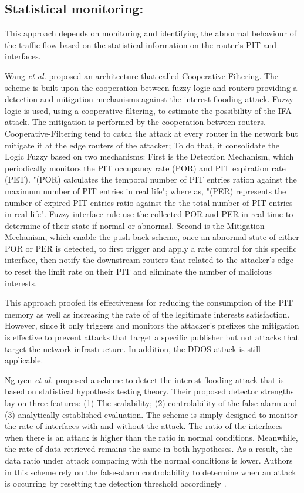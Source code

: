 \documentclass[conference]{IEEEtran}
\begin{document}
\subsection{Statistical monitoring:}

This approach depends on monitoring and identifying the abnormal behaviour of the traffic flow based on the statistical information on the router's PIT and interfaces. 

Wang \textit{et al.} \cite{Wang2014} proposed an architecture that called Cooperative-Filtering. The scheme is built upon the cooperation between fuzzy logic and routers providing a detection and mitigation mechanisms against the interest flooding attack. Fuzzy logic is used, using a cooperative-filtering, to estimate the possibility of the IFA attack. The mitigation is performed by the cooperation between routers. Cooperative-Filtering tend to catch the attack at every router in the network but mitigate it at the edge routers of the attacker; To do that, it consolidate the Logic Fuzzy based on two mechanisms: First is the Detection Mechanism, which periodically monitors the PIT occupancy rate (POR) and  PIT expiration rate (PET). "(POR) calculates the temporal number of PIT entries ration against the maximum number of PIT entries in real life"; where as, "(PER) represents the number of expired PIT entries ratio against the the total number of PIT entries in real life". Fuzzy interface rule use the collected POR and PER in real time to determine of their state if normal or abnormal. Second is the Mitigation Mechanism, which enable the push-back scheme, once an abnormal state of either POR or PER is detected, to first trigger and apply a rate control for this specific interface, then notify the downstream routers that related to the attacker's edge to reset the limit rate on their PIT and eliminate the number of malicious interests.

This approach proofed its effectiveness for reducing the consumption of the PIT memory as well as increasing the rate of of the legitimate interests satisfaction. However, since it only triggers and monitors the attacker's prefixes the mitigation is effective to prevent attacks that target a specific publisher but not attacks that target the network infrastructure. In addition, the DDOS attack is still applicable.    

Nguyen \textit{et al.} \cite{Nguyen2015} proposed a scheme to detect the interest flooding attack that is based on statistical hypothesis testing theory. Their proposed detector strengths lay on three features: (1) The scalability; (2) controlability of the false alarm and (3) analytically established evaluation. The scheme is simply designed to monitor the rate of interfaces with and without the attack. The ratio of the interfaces when there is an attack is higher than the ratio in normal conditions. Meanwhile, the rate of data retrieved remains the same in both hypotheses. As a result, the data ratio under attack comparing with the normal conditions is lower. Authors in this scheme rely on the false-alarm controlability to determine when an attack is occurring by resetting the detection threshold accordingly \cite{8452848}.    
\end{document}
